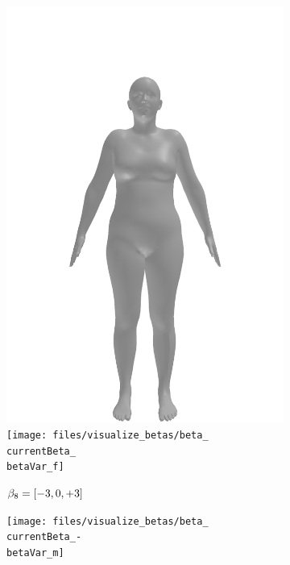 \begin{figure}[h!]
\begin{subfigure}{\betaWidth}
        \includegraphics[width=\imgWidth]{files/visualize_betas/baseline_f}
        \texttt{[image: files/visualize\_betas/beta\_\\currentBeta\_\\betaVar\_f]}
        \caption{$\beta_8 = [-3, 0, +3]$}
    \end{subfigure}
    \begin{subfigure}{\betaWidth}
        \def\currentBeta{8}
        \centering
        \texttt{[image: files/visualize\_betas/beta\_\\currentBeta\_-\\betaVar\_m]}

\end{subfigure}
\end{figure}
